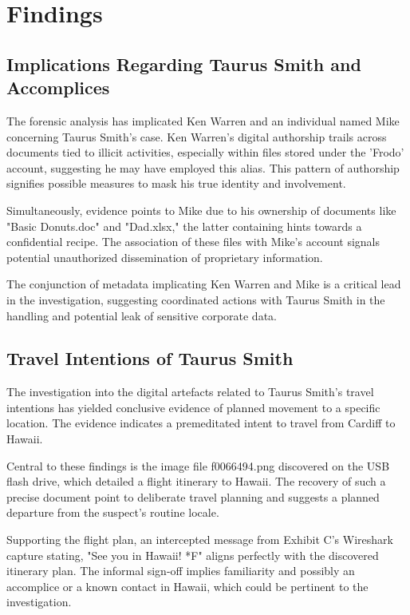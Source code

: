 \chapter{Findings}

\section{Implications Regarding Taurus Smith and Accomplices}
The forensic analysis has implicated Ken Warren and an individual named Mike concerning Taurus Smith's case. Ken Warren's digital authorship trails across documents tied to illicit activities, especially within files stored under the 'Frodo' account, suggesting he may have employed this alias. This pattern of authorship signifies possible measures to mask his true identity and involvement.

Simultaneously, evidence points to Mike due to his ownership of documents like "Basic Donuts.doc" and "Dad.xlsx," the latter containing hints towards a confidential recipe. The association of these files with Mike's account signals potential unauthorized dissemination of proprietary information.

The conjunction of metadata implicating Ken Warren and Mike is a critical lead in the investigation, suggesting coordinated actions with Taurus Smith in the handling and potential leak of sensitive corporate data.

\section{Travel Intentions of Taurus Smith}
The investigation into the digital artefacts related to Taurus Smith's travel intentions has yielded conclusive evidence of planned movement to a specific location. The evidence indicates a premeditated intent to travel from Cardiff to Hawaii.

Central to these findings is the image file f0066494.png discovered on the USB flash drive, which detailed a flight itinerary to Hawaii. The recovery of such a precise document point to deliberate travel planning and suggests a planned departure from the suspect's routine locale.

Supporting the flight plan, an intercepted message from Exhibit C's Wireshark capture stating, "See you in Hawaii! *F" aligns perfectly with the discovered itinerary plan. The informal sign-off implies familiarity and possibly an accomplice or a known contact in Hawaii, which could be pertinent to the investigation.

